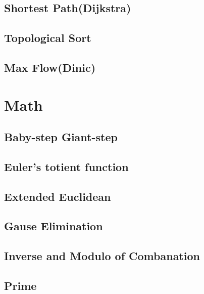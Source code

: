 \subsection{Shortest Path(Dijkstra)}
\raggedbottom
\subsection{Topological Sort}
\raggedbottom
\subsection{Max Flow(Dinic)}
\raggedbottom
\hrulefill
\section{Math}
\subsection{Baby-step Giant-step}
\raggedbottom
\subsection{Euler's totient function}
\raggedbottom
\subsection{Extended Euclidean}
\raggedbottom
\subsection{Gause Elimination}
\raggedbottom
\subsection{Inverse and Modulo of Combanation}
\raggedbottom
\subsection{Prime}
\raggedbottom
